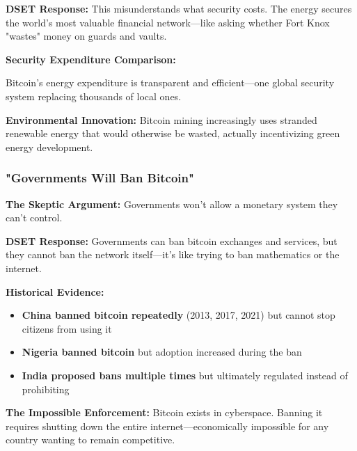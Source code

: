 \documentclass[11pt,oneside]{book}
\begin{document}
\textbf{DSET Response:} This misunderstands what security costs. The energy secures the world's most valuable financial network—like asking whether Fort Knox "wastes" money on guards and vaults.

\textbf{Security Expenditure Comparison:}

Bitcoin's energy expenditure is transparent and efficient—one global security system replacing thousands of local ones.

\textbf{Environmental Innovation:} Bitcoin mining increasingly uses stranded renewable energy that would otherwise be wasted, actually incentivizing green energy development.

\subsubsection{"Governments Will Ban Bitcoin"}

\textbf{The Skeptic Argument:} Governments won't allow a monetary system they can't control.

\textbf{DSET Response:} Governments can ban bitcoin exchanges and services, but they cannot ban the network itself—it's like trying to ban mathematics or the internet.

\textbf{Historical Evidence:}
\begin{itemize}
\item \textbf{China banned bitcoin repeatedly} (2013, 2017, 2021) but cannot stop citizens from using it
\item \textbf{Nigeria banned bitcoin} but adoption increased during the ban
\item \textbf{India proposed bans multiple times} but ultimately regulated instead of prohibiting
\end{itemize}

\textbf{The Impossible Enforcement:} Bitcoin exists in cyberspace. Banning it requires shutting down the entire internet—economically impossible for any country wanting to remain competitive.
\end{document}
